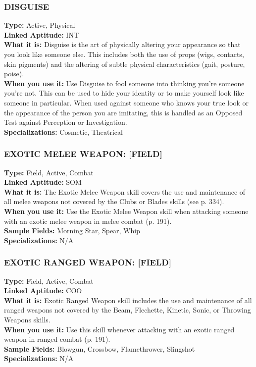 \subsubsection{DISGUISE} \textbf{Type:} Active, Physical \\ \textbf{Linked Aptitude:} INT \\ \textbf{What it is:} Disguise is the art of physically altering your appearance so that you look like someone else. This includes both the use of props (wigs, contacts, skin pigments) and the altering of subtle physical characteristics (gait, posture, poise). \\ \textbf{When you use it:} Use Disguise to fool someone into thinking you’re someone you’re not. This can be used to hide your identity or to make yourself look like someone in particular. When used against someone who knows your true look or the appearance of the person you are imitating, this is handled as an Opposed Test against Perception or Investigation. \\ \textbf{Specializations:} Cosmetic, Theatrical 

\subsubsection{EXOTIC MELEE WEAPON: [FIELD]} \textbf{Type:} Field, Active, Combat \\ \textbf{Linked Aptitude:} SOM \\ \textbf{What it is:} The Exotic Melee Weapon skill covers the use and maintenance of all melee weapons not covered by the Clubs or Blades skills (see p. 334). \\ \textbf{When you use it:} Use the Exotic Melee Weapon skill when attacking someone with an exotic melee weapon in melee combat (p. 191). \\ \textbf{Sample Fields:} Morning Star, Spear, Whip \\ \textbf{Specializations:} N/A 

\subsubsection{EXOTIC RANGED WEAPON: [FIELD]} \textbf{Type:} Field, Active, Combat \\ \textbf{Linked Aptitude:} COO \\ \textbf{What it is:} Exotic Ranged Weapon skill includes the use and maintenance of all ranged weapons not covered by the Beam, Flechette, Kinetic, Sonic, or Throwing Weapons skills. \\ \textbf{When you use it:} Use this skill whenever attacking with an exotic ranged weapon in ranged combat (p. 191). \\ \textbf{Sample Fields:} Blowgun, Crossbow, Flamethrower, Slingshot \\ \textbf{Specializations:} N/A 

